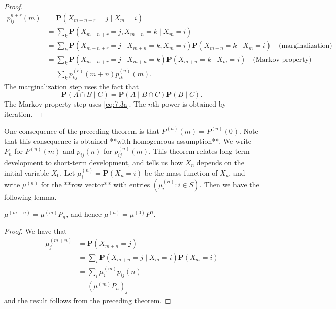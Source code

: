 \begin{proof}
    \begin{equation*}
        \begin{split}
            p_{ij}^{n+r}(m) &= \mathbf{P}(X_{m+n+r} = j \;\vert\; X_m = i) \\ 
            &= \sum_{k} \mathbf{P}(X_{m+n+r} = j, X_{m+n} = k \;\vert\; X_m = i) \\
            &= \sum_{k} \mathbf{P}(X_{m+n+r} = j \;\vert\; X_{m+n} = k, X_m = i) \mathbf{P}(X_{m+n} = k \;\vert\; X_m = i) \quad \text{(marginalization)} \\
            &= \sum_{k} \mathbf{P}(X_{m+n+r} = j \;\vert\; X_{m+n} = k) \mathbf{P}(X_{m+n} = k \;\vert\; X_m = i) \quad \text{(Markov property)} \\
            &= \sum_{k} p_{kj}^{(r)}(m+n) p_{ik}^{(n)}(m) . 
        \end{split}
    \end{equation*}
    The marginalization step uses the fact that 
    \begin{equation*}
        \mathbf{P}(A \cap B \;\vert\; C) = \mathbf{P}(A \;\vert\; B \cap C) \mathbf{P}(B \;\vert\; C).
    \end{equation*}
    The Markov property step uses \eqref{eq:7.3a}. The $n$th power is obtained by iteration.
\end{proof}

One consequence of the preceding theorem is that $P^{(n)}(m) = P^{(n)}(0)$. Note that this consequence is obtained **with homogeneous assumption**. We write $P_n$ for $P^{(n)}(m)$ and $p_{ij}(n)$ for $p_{ij}^{(n)}(m)$. This theorem relates long-term development to short-term development, and tells us how $X_n$ depends on the initial variable $X_0$. Let $\mu_i^{(n)} = \mathbf{P}(X_n = i)$ be the mass function of $X_n$, and write $\mu^{(n)}$ for the **row vector** with entries $(\mu_i^{(n)} : i \in S)$. Then we have the following lemma.

\begin{lemma}
$\mu^{(m+n)} = \mu^{(m)}P_n$, and hence $\mu^{(n)} = \mu^{(0)}P^n$.
\end{lemma}

\begin{proof}
    We have that
    \begin{equation*}
        \begin{split}
            \mu_j^{(m+n)} &= \mathbf{P}(X_{m+n} = j) \\
            &= \sum_{i} \mathbf{P}(X_{m+n} = j \;\vert\; X_m = i) \mathbf{P}(X_m = i) \\
            &= \sum_{i} \mu_i^{(m)} p_{ij}(n) \\
            &= (\mu^{(m)} P_n)_j
        \end{split}
    \end{equation*}
    and the result follows from the preceding theorem.
\end{proof}

